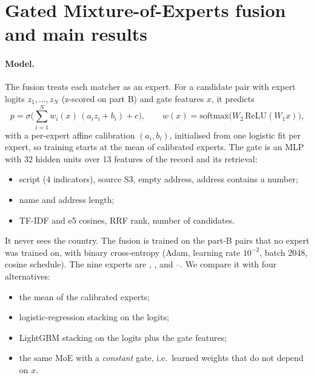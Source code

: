 \section{Gated Mixture-of-Experts fusion and main results}
\label{sec:fusion}

\paragraph{Model.} The fusion treats each matcher as an expert. For a candidate
pair with expert logits $z_1,\dots,z_N$ (z-scored on part B) and gate features $x$, it predicts
\[
p=\sigma\Big(\sum_{i=1}^{N} w_i(x)\,(a_i z_i+b_i)+c\Big),\qquad w(x)=\mathrm{softmax}\big(W_2\,\mathrm{ReLU}(W_1x)\big),
\]
with a per-expert affine calibration $(a_i,b_i)$, initialised from one logistic fit per expert, so training
starts at the mean of calibrated experts. The gate is an MLP with 32 hidden units over 13 features of the
record and its retrieval:
\begin{itemize}
  \item script (4 indicators), source S3, empty address, address contains a number;
  \item name and address length;
  \item TF-IDF and e5 cosines, RRF rank, number of candidates.
\end{itemize}
It never sees the country. The fusion is trained on the part-B pairs that no expert was trained on, with
binary cross-entropy (Adam, learning rate $10^{-2}$, batch 2048, cosine schedule). The nine experts are
, ,  and --. We compare it with four alternatives:
\begin{itemize}
  \item the mean of the calibrated experts;
  \item logistic-regression stacking on the logits;
  \item LightGBM stacking on the logits plus the gate features;
  \item the same MoE with a \emph{constant} gate, i.e.\ learned weights that do not depend on $x$.
\end{itemize}

